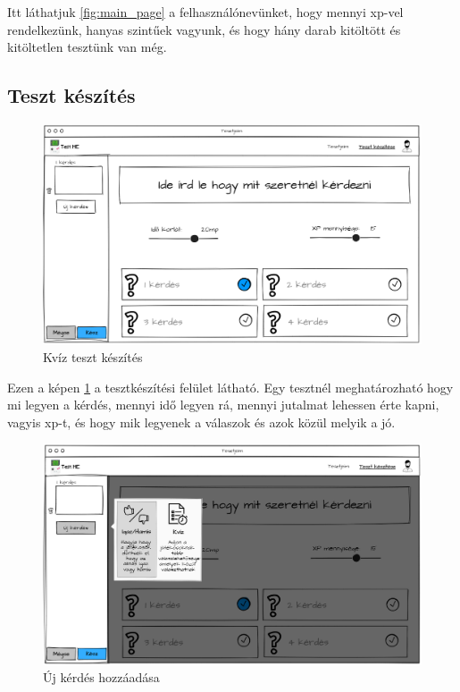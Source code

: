 Itt láthatjuk \ref{fig:main_page} a felhasználónevünket, hogy mennyi xp-vel rendelkezünk, hanyas szintűek vagyunk, és hogy hány darab kitöltött és kitöltetlen tesztünk van még.

\subsection{Teszt készítés}

\begin{figure}[H]
    \centering
    \includegraphics[width=\linewidth]{images/make_test_wireframe.png}
    \caption{Kvíz teszt készítés}
    \label{fig:new_quiz_question}
\end{figure}

Ezen a képen \ref{fig:new_quiz_question} a tesztkészítési felület látható. Egy tesztnél meghatározható hogy mi legyen a kérdés, mennyi idő legyen rá, mennyi jutalmat lehessen érte kapni, vagyis xp-t, és hogy mik legyenek a válaszok és azok közül melyik a jó.

\begin{figure}[H]
    \centering
    \includegraphics[width=\linewidth]{images/make_test2_wireframe.png}
    \caption{Új kérdés hozzáadása}
    \label{fig:new_question}
\end{figure}

